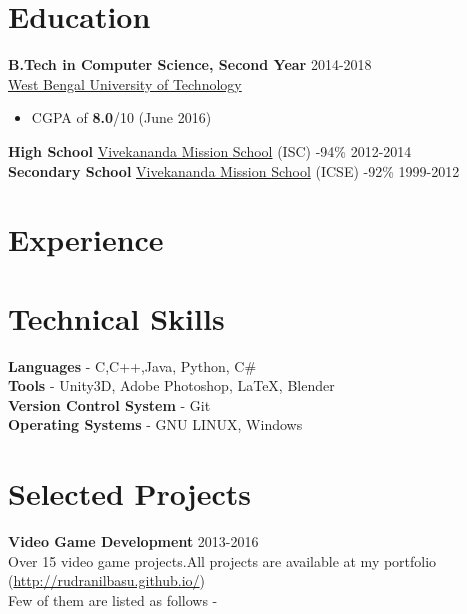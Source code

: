 \documentclass[margin, centered]{res}
\begin{document}
\begin{resume}

\section{Education}
\textbf{B.Tech in Computer Science, Second Year} \hfill 2014-2018\\
\href{http://www.wbut.ac.in/}{West Bengal University of Technology}

\begin{itemize}
 \item CGPA of \textbf{8.0}/10 (June 2016)
\end{itemize}
\textbf{High School} \href{http://www.vmskolkata.org/}{Vivekananda Mission School} (ISC) -94\% \hfill 2012-2014\\
\textbf{Secondary School} \href{http://www.vmskolkata.org/}{Vivekananda Mission School} (ICSE) -92\% \hfill 1999-2012

\section{Experience}

\section{Technical Skills}
\textbf{Languages} - C,C++,Java, Python, C\#\\
\textbf{Tools} - Unity3D, Adobe Photoshop,  \LaTeX , Blender\\
\textbf{Version Control System} - Git \\
\textbf{Operating Systems} - GNU LINUX, Windows
\section{Selected Projects}
\textbf{Video Game Development} \hfill 2013-2016\\
Over 15 video game projects.All projects are available at my portfolio (\href{http://rudranilbasu.github.io/}{http://rudranilbasu.github.io/})\\
Few of them are listed as follows - 


\end{resume}
\end{document}
